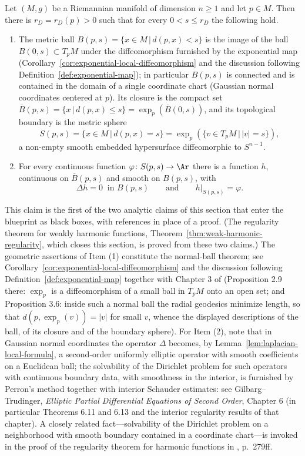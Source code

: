 \begin{claim}
\label{claim:dirichlet-problem-small-balls}
Let $(M,g)$ be a Riemannian manifold of dimension $n\ge1$ and let
$p\in M$. Then there is $r_D=r_D(p)>0$ such that for every
$0<s\le r_D$ the following hold.
\begin{enumerate}
\item The metric ball $B(p,s)=\{x\in M\,|\,d(p,x)<s\}$ is the image
of the ball $B(0,s)\subset T_pM$ under the diffeomorphism furnished
by the exponential map
(Corollary~\ref{cor:exponential-local-diffeomorphism} and the
discussion following Definition~\ref{def:exponential-map}); in
particular $B(p,s)$ is connected and is contained in the domain of
a single coordinate chart (Gaussian normal coordinates centered at
$p$). Its closure is the compact set
$\overline{B}(p,s)=\{x\,|\,d(p,x)\le
s\}=\exp_p\left(\overline{B}(0,s)\right)$, and its topological
boundary is the metric sphere
$$S(p,s)=\{x\in M\,|\,d(p,x)=s\}=\exp_p\left(\{v\in
T_pM\,|\,|v|=s\}\right),$$ a non-empty smooth embedded hypersurface
diffeomorphic to $S^{n-1}$.
\item For every continuous function $\varphi\colon S(p,s)\to \Ar$
there is a function $h$, continuous on $\overline{B}(p,s)$ and
smooth on $B(p,s)$, with
$$\Delta h=0\ \text{ in } B(p,s)\qquad \text{and}\qquad
h|_{S(p,s)}=\varphi.$$
\end{enumerate}
This claim is the first of the two analytic claims of this section
that enter the blueprint as black boxes, with references in place
of a proof. (The regularity theorem for weakly harmonic functions,
Theorem~\ref{thm:weak-harmonic-regularity}, which closes this
section, is proved from these two claims.) The geometric assertions of Item (1)
constitute the normal-ball theorem; see
Corollary~\ref{cor:exponential-local-diffeomorphism} and the
discussion following Definition~\ref{def:exponential-map} together
with Chapter 3 of \cite{doCarmo} (Proposition 2.9 there: $\exp_p$
is a diffeomorphism of a small ball in $T_pM$ onto an open set; and
Proposition 3.6: inside such a normal ball the radial geodesics
minimize length, so that $d(p,\exp_p(v))=|v|$ for small $v$, whence
the displayed descriptions of the ball, of its closure and of the
boundary sphere). For Item (2), note that in Gaussian normal
coordinates the operator $\Delta$ becomes, by
Lemma~\ref{lem:laplacian-local-formula}, a second-order uniformly
elliptic operator with smooth coefficients on a Euclidean ball; the
solvability of the Dirichlet problem for such operators with
continuous boundary data, with smoothness in the interior, is
furnished by Perron's method together with interior Schauder
estimates: see Gilbarg--Trudinger, {\it Elliptic Partial
Differential Equations of Second Order}, Chapter 6 (in particular
Theorems 6.11 and 6.13 and the interior regularity results of that
chapter). A closely related fact---solvability of the Dirichlet
problem on a neighborhood with smooth boundary contained in a
coordinate chart---is invoked in the proof of the regularity
theorem for harmonic functions in \cite{Petersen}, p.~279ff.
\end{claim}

